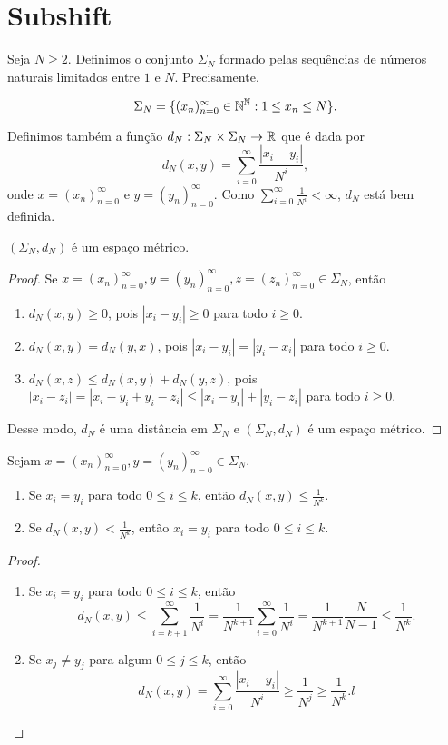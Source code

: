 \section{Subshift}

Seja $N \geq 2$. Definimos o conjunto $\Sigma_N$ formado pelas sequências de números naturais limitados entre $1$ e $N$. Precisamente,

$$\Sigma_N = \{ (x_n)_{n=0}^{\infty} \in \mathbb{N}^{\mathbb{N}} : 1 \leq x_n \leq N \}.$$

Definimos também a função $d_N : \Sigma_N \times \Sigma_N \to \mathbb{R}$ que é dada por
$$d_N(x, y) = \sum_{i=0}^\infty \frac{|x_i - y_i|}{N^i},$$
onde $x = (x_n)_{n=0}^{\infty}$ e $y = (y_n)_{n=0}^{\infty}$. Como $\sum_{i=0}^\infty \frac{1}{N^i} < \infty$, $d_N$ está bem definida.


\begin{proposition}
$(\Sigma_N, d_N)$ é um espaço métrico.
\end{proposition}


\begin{proof}
Se $x = (x_n)_{n=0}^{\infty}, y = (y_n)_{n=0}^{\infty}, z = (z_n)_{n=0}^{\infty} \in \Sigma_N$, então
\begin{enumerate}
\item $d_N(x, y) \geq 0$, pois $|x_i - y_i| \geq 0$ para todo $i \geq 0$.
\item $d_N(x, y) = d_N(y, x)$, pois $|x_i - y_i| = |y_i - x_i|$ para todo $i \geq 0$.
\item $d_N(x, z) \leq d_N(x, y) + d_N(y, z)$, pois $|x_i - z_i| = |x_i - y_i + y_i - z_i| \leq |x_i - y_i| + |y_i - z_i|$ para todo $i \geq 0$.
\end{enumerate}
Desse modo, $d_N$ é uma distância em $\Sigma_N$ e $(\Sigma_N, d_N)$ é um espaço métrico.
\end{proof}


\begin{proposition}
Sejam $x = (x_n)_{n=0}^{\infty}, y = (y_n)_{n=0}^{\infty} \in \Sigma_N$.
\begin{enumerate}
\item Se $x_i = y_i$ para todo $0 \leq i \leq k$, então $d_N(x, y) \leq \frac{1}{N^k}$.
\item Se $d_N(x, y) < \frac{1}{N^k}$, então $x_i = y_i$ para todo $0 \leq i \leq k$.
\end{enumerate}
\end{proposition}


\begin{proof}
\begin{enumerate}
\item Se $x_i = y_i$ para todo $0 \leq i \leq k$, então
$$d_N(x, y) \leq \sum_{i=k+1}^\infty \frac{1}{N^i} = \frac{1}{N^{k+1}}\sum_{i=0}^\infty \frac{1}{N^{i}} = \frac{1}{N^{k+1}} \frac{N}{N - 1} \leq \frac{1}{N^k}.$$

\item Se $x_j \neq y_j$ para algum $0 \leq j \leq k$, então
$$d_N(x, y) = \sum_{i=0}^\infty \frac{|x_i - y_i|}{N^i} \geq \frac{1}{N^j} \geq \frac{1}{N^k}.l$$
\end{enumerate}
\end{proof}

